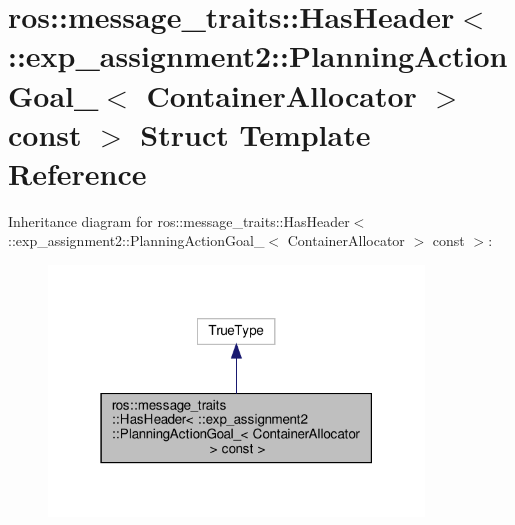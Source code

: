 \hypertarget{structros_1_1message__traits_1_1HasHeader_3_01_1_1exp__assignment2_1_1PlanningActionGoal___3_01C970e4692f20339517dceed8e4e93b601}{}\section{ros\+:\+:message\+\_\+traits\+:\+:Has\+Header$<$ \+:\+:exp\+\_\+assignment2\+:\+:Planning\+Action\+Goal\+\_\+$<$ Container\+Allocator $>$ const $>$ Struct Template Reference}
\label{structros_1_1message__traits_1_1HasHeader_3_01_1_1exp__assignment2_1_1PlanningActionGoal___3_01C970e4692f20339517dceed8e4e93b601}


Inheritance diagram for ros\+:\+:message\+\_\+traits\+:\+:Has\+Header$<$ \+:\+:exp\+\_\+assignment2\+:\+:Planning\+Action\+Goal\+\_\+$<$ Container\+Allocator $>$ const $>$\+:
\nopagebreak
\begin{figure}[H]
\begin{center}
\leavevmode
\includegraphics[width=283pt]{structros_1_1message__traits_1_1HasHeader_3_01_1_1exp__assignment2_1_1PlanningActionGoal___3_01C2bbe1645f3ded80339ca11ad5b0587cc}
\end{center}
\end{figure}


